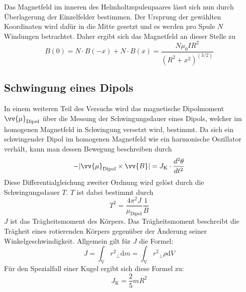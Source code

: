 Das Magnetfeld im inneren des Helmholtzspulenpaares lässt sich nun durch Überlagerung der Einzelfelder bestimmen. Der Ursprung der gewählten Koordinaten wird dafür in die Mitte 
gesetzt und es werden pro Spule $N$ Windungen betrachtet. Daher ergibt sich das Magnetfeld an dieser Stelle zu
\begin{equation}
    \label{eqn:Helmholtz_B}
    B(0) = N\cdot B(-x) +N\cdot B(x) = \frac{N\mu_0 IR^2}{\left(R^2 + x^2 \right)^{(3/2)}}
\end{equation}

\subsection{Schwingung eines Dipols}
\label{subsec:Schwingung}
In einem weiteren Teil des Versuchs wird das magnetische Dipolmoment $\vv{\mu}_{\text{Dipol}}$ über die Messung der Schwingungsdauer eines Dipols, welcher im homogenen Magnetfeld
in Schwingung versetzt wird, bestimmt. Da sich ein schwingender Dipol im homogenen Magnetfeld wie ein harmonische Oszillator verhält, kann man dessen Bewegung beschreiben durch
\begin{equation}
    \label{eqn:BewegungsgleichungKugel}
    -\lvert \vv{\mu}_{\text{Dipol}} \times \vv{B}\rvert = J_{\text{K}} \cdot \frac{d^2 \theta}{dt^2}
\end{equation}
Diese Differentialgleichung zweiter Ordnung wird gelöst durch die Schwingungsdauer $T$. $T$ ist dabei bestimmt durch
\begin{equation}
    \label{eqn:Schwingungsdauer}
    T^2 = \frac{4{\pi}^2 J}{{\mu}_{\text{Dipol}}}\frac{1}{B}
\end{equation} 
$J$ ist das Trägheitsmoment des Körpers. Das Trägheitsmoment beschreibt die Trägheit eines rotierenden Körpers gegenüber der Änderung seiner Winkelgeschwindigkeit.
Allgemein gilt für $J$ die Formel:
\begin{equation}
    \label{eqn:Trägheitsmoment}
    J = \int_{\text{V}} {r^2}_{\bot} \text{d}m = \int_{\text{V}} {r^2}_{\bot} \rho \text{d}V
\end{equation} 
\cite{Demtröder_Exp_P_1}
Für den Spezialfall einer Kugel ergibt sich diese Formel zu:
\begin{equation}
    \label{eqn:Trägheitsmoment_Kugel}
    J_{\text{K}} = \frac{2}{5} m R^2
\end{equation}
